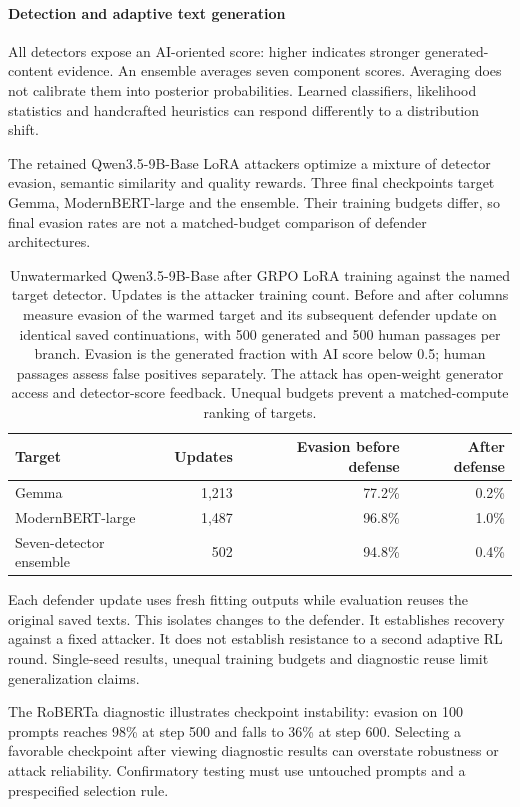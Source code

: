 \paragraph{Detection and adaptive text generation}
All detectors expose an AI-oriented score: higher indicates stronger generated-content evidence. An ensemble averages seven component scores. Averaging does not calibrate them into posterior probabilities. Learned classifiers, likelihood statistics and handcrafted heuristics can respond differently to a distribution shift.

The retained Qwen3.5-9B-Base LoRA attackers optimize a mixture of detector evasion, semantic similarity and quality rewards. Three final checkpoints target Gemma, ModernBERT-large and the ensemble. Their training budgets differ, so final evasion rates are not a matched-budget comparison of defender architectures.

\begin{table}[ht]
\centering\small
\begin{tabular}{lrrr}\toprule
Target & Updates & Evasion before defense & After defense\\\midrule
Gemma & 1,213 & 77.2\% & 0.2\%\\
ModernBERT-large & 1,487 & 96.8\% & 1.0\%\\
Seven-detector ensemble & 502 & 94.8\% & 0.4\%\\\bottomrule
\end{tabular}
\caption{Unwatermarked Qwen3.5-9B-Base after GRPO LoRA training against the named target detector. Updates is the attacker training count. Before and after columns measure evasion of the warmed target and its subsequent defender update on identical saved continuations, with 500 generated and 500 human passages per branch. Evasion is the generated fraction with AI score below 0.5; human passages assess false positives separately. The attack has open-weight generator access and detector-score feedback. Unequal budgets prevent a matched-compute ranking of targets.}
\end{table}

Each defender update uses fresh fitting outputs while evaluation reuses the original saved texts. This isolates changes to the defender. It establishes recovery against a fixed attacker. It does not establish resistance to a second adaptive RL round. Single-seed results, unequal training budgets and diagnostic reuse limit generalization claims.

The RoBERTa diagnostic illustrates checkpoint instability: evasion on 100 prompts reaches 98\% at step 500 and falls to 36\% at step 600. Selecting a favorable checkpoint after viewing diagnostic results can overstate robustness or attack reliability. Confirmatory testing must use untouched prompts and a prespecified selection rule.

